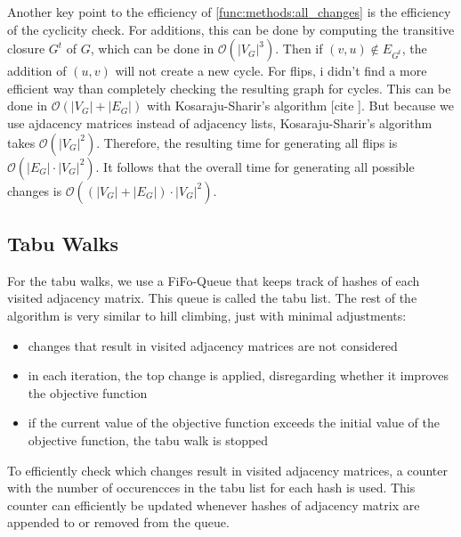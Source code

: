 \documentclass[sigconf, fleqn, prologue, dvipsnames]{acmart}
\newcommand{\abs}[1]{\left\vert #1 \right\vert}
\def\O{\mathcal{O}}
\def\ndy{%
    \reversemarginpar%
    \marginpar{\raggedleft\textcolor{red}{\rule{2mm}{2mm}}}%
}
\begin{document}
Another key point to the efficiency of \autoref{func:methods:all_changes} is the efficiency of the cyclicity check.
For additions, this can be done by computing the transitive closure $G^t$ of $G$, which can be done in $\O(\abs{V_G}^3)$.
Then if $(v, u) \notin E_{G^t}$, the addition of $(u,v)$ will not create a new cycle.
For flips, i didn't find a more efficient way than completely checking the resulting graph for cycles.
This can be done in $\O(\abs{V_G} + \abs{E_G})$ with Kosaraju-Sharir's algorithm [cite\ndy].
But because we use ajdacency matrices instead of adjacency lists, Kosaraju-Sharir's algorithm takes $\O(\abs{V_G}^2)$.
Therefore, the resulting time for generating all flips is $\O(\abs{E_G} \cdot \abs{V_G}^2)$.
It follows that the overall time for generating all possible changes is $\O((\abs{V_G} + \abs{E_G}) \cdot \abs{V_G}^2)$.

\FloatBarrier


\subsection{Tabu Walks}
For the tabu walks, we use a FiFo-Queue that keeps track of hashes of each visited adjacency matrix. This queue is called the tabu list.
The rest of the algorithm is very similar to hill climbing, just with minimal adjustments:
\begin{itemize}
	\item changes that result in visited adjacency matrices are not considered
	\item in each iteration, the top change is applied, disregarding whether it improves the objective function
	\item if the current value of the objective function exceeds the initial value of the objective function, the tabu walk is stopped
\end{itemize}
To efficiently check which changes result in visited adjacency matrices, a counter with the number of occurencces in the tabu list for each hash is used.
This counter can efficiently be updated whenever hashes of adjacency matrix are appended to or removed from the queue.
\end{document}
